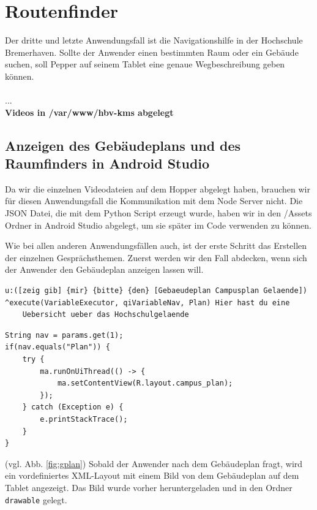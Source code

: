 \section{Routenfinder}

Der dritte und letzte Anwendungsfall ist die Navigationshilfe in der Hochschule Bremerhaven. Sollte der Anwender einen bestimmten Raum oder ein 
Gebäude suchen, soll Pepper auf seinem Tablet eine genaue Wegbeschreibung geben können. 
\\\\
...
\\
\textbf{Videos in /var/www/hbv-kms abgelegt}
\\


\subsection{Anzeigen des Gebäudeplans und des Raumfinders in Android Studio}

Da wir die einzelnen Videodateien auf dem Hopper abgelegt haben, brauchen wir für diesen Anwendungsfall die Kommunikation mit dem Node Server nicht. 
Die JSON Datei, die mit dem Python Script erzeugt wurde, haben wir in den /Assets Ordner in Android Studio abgelegt, um sie später im Code verwenden zu können. 

Wie bei allen anderen Anwendungsfällen auch, ist der erste Schritt das Erstellen der einzelnen Gesprächsthemen. 
Zuerst werden wir den Fall abdecken, wenn sich der Anwender den Gebäudeplan anzeigen lassen will.\\

\begin{lstlisting}
u:([zeig gib] {mir} {bitte} {den} [Gebaeudeplan Campusplan Gelaende])
^execute(VariableExecutor, qiVariableNav, Plan) Hier hast du eine 
    Uebersicht ueber das Hochschulgelaende
\end{lstlisting}


\begin{lstlisting}
String nav = params.get(1);
if(nav.equals("Plan")) {
    try {
        ma.runOnUiThread(() -> {
            ma.setContentView(R.layout.campus_plan);
        });
    } catch (Exception e) {
        e.printStackTrace();
    }
}
\end{lstlisting}

(vgl. Abb. \ref{fig:gplan}) Sobald der Anwender nach dem Gebäudeplan fragt, wird ein vordefiniertes XML-Layout mit einem Bild von dem 
Gebäudeplan auf dem Tablet angezeigt. Das Bild wurde vorher heruntergeladen und in den Ordner 
\verb|drawable| gelegt.\\

